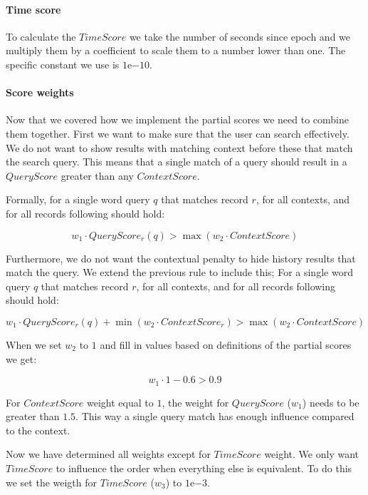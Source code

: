 \paragraph{Time score}


To calculate the \(TimeScore\) we take the number of seconds since epoch and we multiply them by a coefficient to scale them to a number lower than one. The specific constant we use is $1\mathrm{e}{-10}$.

\paragraph{Score weights}

Now that we covered how we implement the partial scores we need to combine them together.
First we want to make sure that the user can search effectively. We do not want to show results with matching context before these that match the search query. This means that a single match of a query should result in a \(QueryScore\) greater than any \(ContextScore\).

Formally, for a single word query \(q\) that matches record \(r\), for all contexts, and for all records following should hold: 

\[  w_1 \cdot QueryScore_r(q) > \max{(w_2 \cdot ContextScore)} \]

Furthermore, we do not want the contextual penalty to hide history results that match the query. We extend the previous rule to include this; For a single word query \(q\) that matches record \(r\), for all contexts, and for all records following should hold:

\[  w_1 \cdot QueryScore_r(q) + \min{(w_2 \cdot ContextScore_r)} > \max{(w_2 \cdot ContextScore)} \]

When we set \(w_2\) to \(1\) and fill in values based on definitions of the partial scores we get:

\[  w_1 \cdot 1 - 0.6 > 0.9 \]

For \(ContextScore\) weight equal to \(1\), the weight for \(QueryScore\) (\(w_1\)) needs to be greater than \(1.5\). This way a single query match has enough influence compared to the context.

Now we have determined all weights except for \(TimeScore\) weight. We only want \(TimeScore\) to influence the order when everything else is equivalent. To do this we set the weigth for \(TimeScore\) (\(w_3\)) to $1\mathrm{e}{-3}$.


